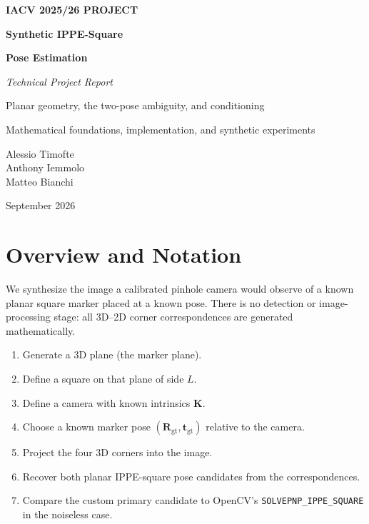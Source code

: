 \documentclass[11pt,a4paper]{article}
\theoremstyle{definition}
\theoremstyle{plain}
\theoremstyle{remark}
\newcommand{\flag}{\texttt{SOLVEPNP\allowbreak\_IPPE\allowbreak\_SQUARE}}
\newcommand{\Rgt}{\mathbf{R}_{\text{gt}}}
\newcommand{\tgt}{\mathbf{t}_{\text{gt}}}
\newcommand{\KK}{\mathbf{K}}
\begin{document}
\begin{titlepage}
\centering
\vspace*{3cm}
{\color{accent2}\bfseries\large IACV 2025/26 PROJECT}\par
\vspace{0.6cm}
{\color{accent}\bfseries\Huge Synthetic IPPE-Square}\par
\vspace{0.3cm}
{\color{accent}\bfseries\Huge Pose Estimation}\par
\vspace{0.8cm}
{\color{greytext}\itshape\Large Technical Project Report}\par
\vspace{0.5cm}
{\color{greytext}\large Planar geometry, the two-pose ambiguity, and conditioning}\par
\vspace{0.4cm}
{\color{greytext} Mathematical foundations, implementation, and synthetic experiments}
\vfill
{\color{greytext}\large Alessio Timofte\\Anthony Iemmolo\\Matteo Bianchi\par}
\vfill
{\color{greytext} September 2026}
\end{titlepage}

\tableofcontents
\thispagestyle{empty}
\clearpage

\section{Overview and Notation}
\label{sec:overview}

We synthesize the image a calibrated pinhole camera would observe of a
known planar square marker placed at a known pose. There is no detection or
image-processing stage: all 3D--2D corner correspondences are generated
mathematically.

\begin{enumerate}[label=\textbf{Step \arabic*.}, leftmargin=*]
  \item Generate a 3D plane (the marker plane).
  \item Define a square on that plane of side $L$.
  \item Define a camera with known intrinsics $\KK$.
  \item Choose a known marker pose $(\Rgt, \tgt)$ relative to the camera.
  \item Project the four 3D corners into the image.
  \item Recover both planar IPPE-square pose candidates from the correspondences.
  \item Compare the custom primary candidate to OpenCV's
        \flag{} in the noiseless case.
\end{enumerate}
\end{document}
